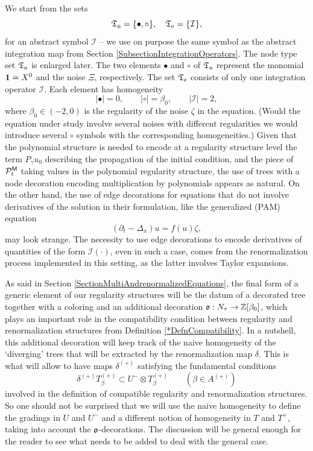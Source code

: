 \documentclass[10pt, reqno]{amsart}
\numberwithin{subsection}{section}
\numberwithin{subsubsection}{subsection}
\numberwithin{equation}{section} %
\theoremstyle{mystyle}
\theoremstyle{mystyle2}
\theoremstyle{mystyle3}
\newcommand\bbZ{\mathbb{Z}}
\newcommand{\mcI}{\mathcal{I}}
\newcommand{\mcP}{\mathcal{P}}
\begin{document}
We start from the sets
$$
\frak{T}_{\text{n}}=\{\bullet,\circ\},\quad\frak{T}_{\text{e}}=\{\mcI\},
$$
for an abstract symbol $\mcI$ -- we use on purpose the same symbol as the 
abstract integration map from Section \ref{SubsectionIntegrationOperators}. The node type set $\frak{T}_{\text{n}}$ is enlarged later. The two elements $\bullet$ and $\circ$ of $\frak{T}_{\text{n}}$ represent the monomial ${\bf1}=X^0$ and the noise $\Xi$, respectively. The set $\frak{T}_{\rm e}$ consists of only one integration operator $\mcI$. Each element has homogeneity
$$
\vert\bullet\vert=0,\qquad \vert\circ\vert=\beta_0,\qquad \vert\mcI\vert=2,
$$
where $\beta_0\in(-2,0)$ is the regularity of the noise $\zeta$ in the equation. (Would the equation under study involve several noises with different regularities we would introduce several $\circ$ symbols with the corresponding homogeneities.) Given that the polynomial structure is needed to encode at a regularity structure level the term $P_\gamma u_0$ describing the propagation of the initial condition, and the piece of $\mcP_t^{\sf M}$ taking values in the polynomial regularity structure, the use of trees with a node decoration encoding multiplication by polynomials appears as natural. On the other hand, the use of edge decorations for equations that do not involve derivatives of the solution in their formulation, like the generalized (PAM) equation
$$
(\partial_t-\Delta_x) u = f(u)\zeta,
$$
may look strange. The necessity to use edge decorations to encode derivatives of quantities of the form $\mcI(\cdot)$, even in such a case, comes from the renormalization process implemented in this setting, as the latter involves Taylor expansions.

As said in Section \ref{SectionMultiAndrenormalizedEquations}, the final form of a generic element of our regularity structures will be the datum of a decorated tree together with a coloring and an additional decoration 
$\frak{o}:N_\tau\to\bbZ[\beta_0]$, which plays an important role in the compatibility condition between regularity and renormalization structures from Definition \ref{*DefnCompatibility}. In a nutshell, this additional decoration will keep track of the naive homogeneity of the `diverging' trees that will be extracted by the renormalization map $\delta$. This is what will allow to have maps $\delta^{(+)}$ satisfying the fundamental conditions 
$$
\delta^{(+)} T^{(+)}_\beta \subset U^-\otimes T^{(+)}_\beta \qquad (\beta\in A^{(+)})
$$
involved in the definition of compatible regularity and renormalization structures. So one should not be surprised that we will use the naive homogeneity to define the gradings in $U$ and $U^-$ and a different notion of 
homogeneity in $T$ and $T^+$, taking into account the $\frak{o}$-decorations. The discussion will be general enough for the reader to see what needs to be added to deal with the general case.
\end{document}

